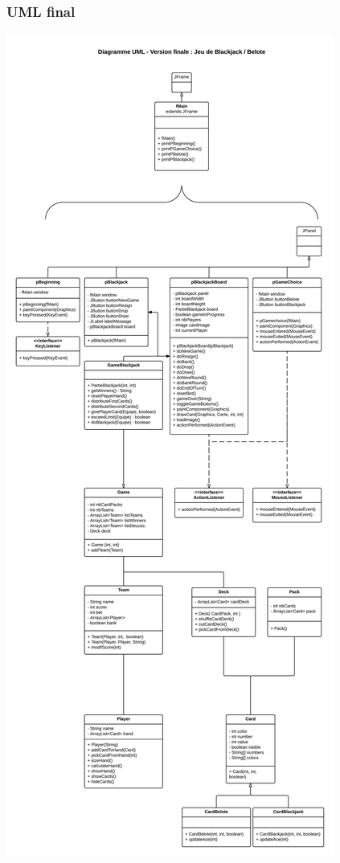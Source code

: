\documentclass[a4paper]{report}
\begin{document}
\subsubsection{UML final}
\begin{center}
	\includegraphics[scale=0.5]{finalUML}
\end{center}
\end{document}
